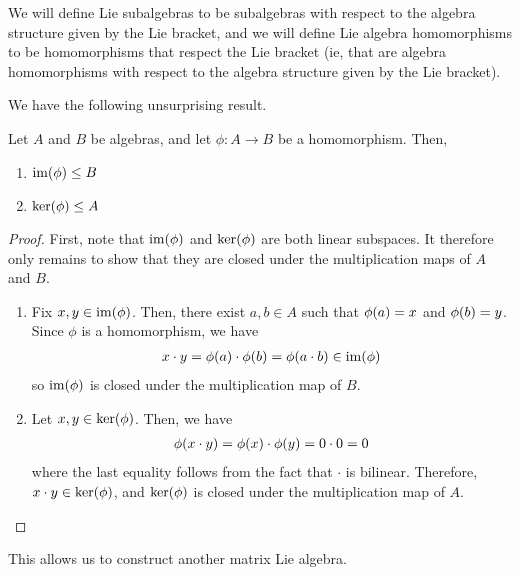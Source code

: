 \begin{boxconvention}
    We will define Lie subalgebras to be subalgebras with respect to the algebra structure given by the Lie bracket, and we will define Lie algebra homomorphisms to be homomorphisms that respect the Lie bracket (ie, that are algebra homomorphisms with respect to the algebra structure given by the Lie bracket).
\end{boxconvention}

We have the following unsurprising result.

\begin{boxlemma}\label{Ch1:Lemma:im_ker_subalg}
    Let $A$ and $B$ be algebras, and let $\phi: A \to B$ be a homomorphism. Then,
    \begin{enumerate}[label= \normalfont\arabic*., noitemsep]
        \item $\operatorname{im}\!\left( \phi \right) \leq B$
        \item $\operatorname{ker}\!\left( \phi \right) \leq A$
    \end{enumerate}
\end{boxlemma}
\begin{proof}
    First, note that $\operatorname{im}\!\left( \phi \right)$ and $\operatorname{ker}\!\left( \phi \right)$ are both linear subspaces. It therefore only remains to show that they are closed under the multiplication maps of $A$ and $B$.
    \begin{enumerate}
        \item Fix $x, y \in \operatorname{im}\!\left( \phi \right)$. Then, there exist $a, b \in A$ such that $\phi\!\left( a \right) = x$ and $\phi\!\left( b \right) = y$. Since $\phi$ is a homomorphism, we have
        \begin{align*}
            x \cdot y = \phi\!\left( a \right) \cdot \phi\!\left( b \right) = \phi\!\left( a \cdot b \right) \in \operatorname{im}\!\left( \phi \right)
        \end{align*}
        so $\operatorname{im}\!\left( \phi \right)$ is closed under the multiplication map of $B$.
        \item Let $x, y \in \operatorname{ker}\!\left( \phi \right)$. Then, we have
        \begin{align*}
            \phi\!\left( x \cdot y \right) = \phi\!\left( x \right) \cdot \phi\!\left( y \right) = 0 \cdot 0 = 0
        \end{align*}
        where the last equality follows from the fact that $\cdot$ is bilinear. Therefore, $x \cdot y \in \operatorname{ker}\!\left( \phi \right)$, and $\operatorname{ker}\!\left( \phi \right)$ is closed under the multiplication map of $A$.
    \end{enumerate}
\end{proof}

This allows us to construct another matrix Lie algebra.

